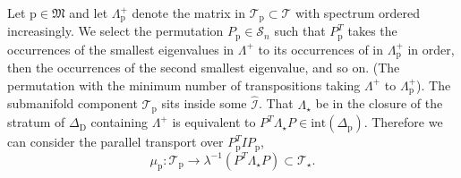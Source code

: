\documentclass[reqno]{amsart}
\newcommand{\p}{\mathrm{p}}
\newcommand{\D}{\mathrm{D}}
\newcommand{\cI}{\mathcal{I}}
\newcommand{\cS}{\mathcal{S}}
\newcommand{\cT}{\mathcal{T}}
\begin{document}
Let $\p\in \mathfrak{M}$ and let $\Lambda^+_\p$ denote the matrix in $\cT_\p\subset \cT$ with spectrum ordered increasingly. We select the permutation $P_\p\in \cS_n$ such that $P^T_\p$ takes the occurrences of the smallest eigenvalues in $\Lambda^+$ to its occurrences of in $\Lambda^+_\p$ in order, then the occurrences of the second smallest eigenvalue, and so on. (The permutation with the minimum number of transpositions taking $\Lambda^+$ to $\Lambda^+_\p$).
The submanifold component $\cT_\p$ sits inside some $\widehat{\cI}$. That $\Lambda_\star$ be in the closure of the stratum of $\Delta_{\D}$ containing $\Lambda^+$ is equivalent to $P^T\Lambda_\star P\in \mathrm{int}(\Delta_{\p})$.
Therefore we can consider  the parallel transport over $P^T_\p I P_\p$,
\[\mu_\p:\cT_\p\to \lambda^{-1}(P^T\Lambda_\star P)\subset \cT_\star.\]
\end{document}
